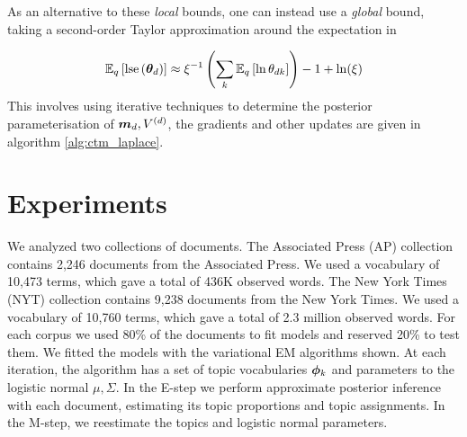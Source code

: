 As an alternative to these \emph{local} bounds, one can instead use a \emph{global} bound, taking a second-order Taylor approximation around the expectation in

\begin{align}
\mathbb{E}_{ { q } }\left[ \text{lse}\left({ \bm \theta_d }\right) \right] \approx \xi^{-1} \left(\sum_k \mathbb{E}_{ { q } }\left[ \ln { \theta_{dk} }  \right]\right) - 1 + \ln (\xi)
\end{align}
This involves using iterative techniques to determine the posterior parameterisation of $\bm m_d, V^{(d)}$, the gradients and other updates are given in algorithm \ref{alg:ctm_laplace}. 

\newcommand \param { { \vv{\phi} } }
\newcommand \params { { \vv{\Phi} } }

\section{Experiments}
We analyzed two collections of documents. The Associated Press (AP) collection contains 2,246 documents from the Associated Press. We used a vocabulary of 10,473 terms, which gave a total of 436K observed words. The New York Times (NYT) collection contains 9,238 documents from the New York Times. We used a vocabulary of 10,760 terms, which gave a total of 2.3 million observed words. For each corpus we used 80\% of the documents to fit models and reserved 20\% to test them.
We fitted the models with the variational EM algorithms shown. At each iteration, the algorithm has a set of topic vocabularies $\param_k$ and parameters to the logistic normal $\mu, \Sigma$. In the E-step we perform approximate posterior inference with each document, estimating its topic proportions and topic assignments. In the M-step, we reestimate the topics and logistic normal parameters. 

